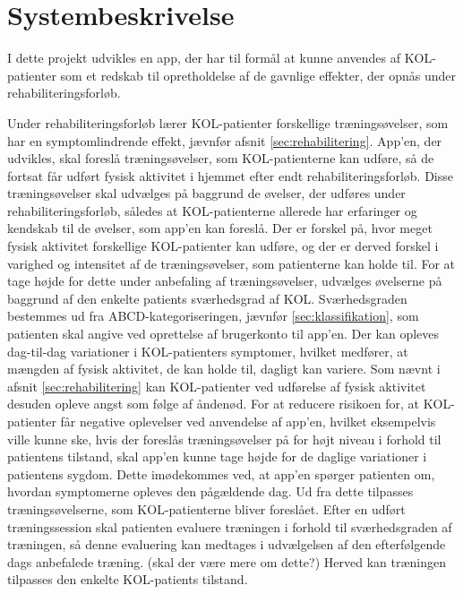 \section{Systembeskrivelse} \label{sec:systembeskrivelse}
I dette projekt udvikles en app, der har til formål at kunne anvendes af KOL-patienter som et redskab til opretholdelse af de gavnlige effekter, der opnås under rehabiliteringsforløb.

Under rehabiliteringsforløb lærer KOL-patienter forskellige træningsøvelser, som har en symptomlindrende effekt, jævnfør afsnit \ref{sec:rehabilitering}. App’en, der udvikles, skal foreslå træningsøvelser, som KOL-patienterne kan udføre, så de fortsat får udført fysisk aktivitet i hjemmet efter endt rehabiliteringsforløb. Disse træningsøvelser skal udvælges på baggrund de øvelser, der udføres under rehabiliteringsforløb, således at KOL-patienterne allerede har erfaringer og kendskab til de øvelser, som app’en kan foreslå.
Der er forskel på, hvor meget fysisk aktivitet forskellige KOL-patienter kan udføre, og der er derved forskel i varighed og intensitet af de træningsøvelser, som patienterne kan holde til. For at tage højde for dette under anbefaling af træningsøvelser, udvælges øvelserne på baggrund af den enkelte patients sværhedsgrad af KOL. Sværhedsgraden bestemmes ud fra ABCD-kategoriseringen, jævnfør \ref{sec:klassifikation}, som patienten skal angive ved oprettelse af brugerkonto til app’en.
Der kan opleves dag-til-dag variationer i KOL-patienters symptomer, hvilket medfører, at mængden af fysisk aktivitet, de kan holde til, dagligt kan variere. Som nævnt i afsnit \ref{sec:rehabilitering} kan KOL-patienter ved udførelse af fysisk aktivitet desuden opleve angst som følge af åndenød. For at reducere risikoen for, at KOL-patienter får negative oplevelser ved anvendelse af app’en, hvilket eksempelvis ville kunne ske, hvis der foreslås træningsøvelser på for højt niveau i forhold til patientens tilstand, skal app’en kunne tage højde for de daglige variationer i patientens sygdom. Dette imødekommes ved, at app’en spørger patienten om, hvordan symptomerne opleves den pågældende dag. Ud fra dette tilpasses træningsøvelserne, som KOL-patienterne bliver foreslået. Efter en udført træningssession skal patienten evaluere træningen i forhold til sværhedsgraden af træningen, så denne evaluering kan medtages i udvælgelsen af den efterfølgende dags anbefalede træning. (skal der være mere om dette?) Herved kan træningen tilpasses den enkelte KOL-patients tilstand.

